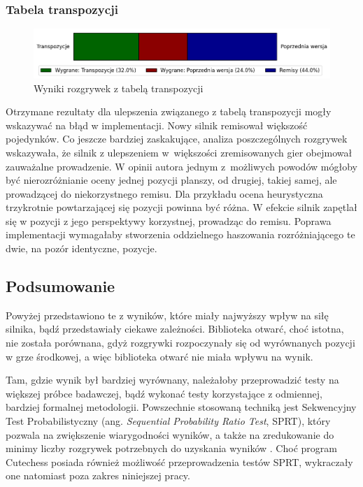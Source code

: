 \subsubsection{Tabela transpozycji}
\begin{figure}[ht]
    \centering
    \includegraphics[width=1\linewidth]{rozdzialy/rozdzial03/1_porownanie-wersji-silnika/rysunki/wyniki-transpozycje}
    \caption{Wyniki rozgrywek z tabelą transpozycji}
    \label{fig:wyniki-transpozycje}
\end{figure}
Otrzymane rezultaty dla ulepszenia związanego z tabelą transpozycji mogły wskazywać na błąd w implementacji.
Nowy silnik remisował większość pojedynków.
Co jeszcze bardziej zaskakujące, analiza poszczególnych rozgrywek wskazywała, że silnik z ulepszeniem w~większości zremisowanych gier obejmował zauważalne prowadzenie.
W opinii autora jednym z~możliwych powodów mógłoby być nierozróżnianie oceny jednej pozycji planszy, od drugiej, takiej samej, ale prowadzącej do niekorzystnego remisu.
Dla przykładu ocena heurystyczna trzykrotnie powtarzającej się pozycji powinna być różna.
W efekcie silnik zapętlał się w pozycji z jego perspektywy korzystnej, prowadząc do remisu.
Poprawa implementacji wymagałaby stworzenia oddzielnego haszowania rozróżniającego te dwie, na pozór identyczne, pozycje.


\subsection{Podsumowanie}\label{subsec:podsumowanie}
Powyżej przedstawiono te z wyników, które miały najwyższy wpływ na siłę silnika, bądź przedstawiały ciekawe zależności.
Biblioteka otwarć, choć istotna, nie została porównana, gdyż rozgrywki rozpoczynały się od wyrównanych pozycji w grze środkowej, a więc biblioteka otwarć nie miała wpływu na wynik.

Tam, gdzie wynik był bardziej wyrównany, należałoby przeprowadzić testy na większej próbce badawczej, bądź wykonać testy korzystające z odmiennej, bardziej formalnej metodologii.
Powszechnie stosowaną techniką jest Sekwencyjny Test Probabilistyczny (ang. \emph{Sequential Probability Ratio Test}, SPRT), który pozwala na zwiększenie wiarygodności wyników, a także na zredukowanie do minimy liczby rozgrywek potrzebnych do uzyskania wyników \cite*{wiki-sprt}.
Choć program Cutechess posiada również możliwość przeprowadzenia testów SPRT, wykraczały one natomiast poza zakres niniejszej pracy.


